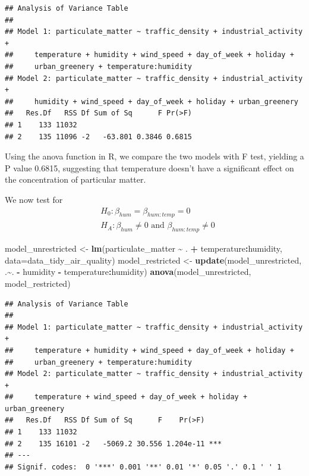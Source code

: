\documentclass[12pt,halfline,a4paper,]{ouparticle}
\newenvironment{Shaded}{\begin{snugshade}}{\end{snugshade}}
\newcommand{\AttributeTok}[1]{\textcolor[rgb]{0.13,0.29,0.53}{#1}}
\newcommand{\FunctionTok}[1]{\textcolor[rgb]{0.13,0.29,0.53}{\textbf{#1}}}
\newcommand{\NormalTok}[1]{#1}
\newcommand{\OtherTok}[1]{\textcolor[rgb]{0.56,0.35,0.01}{#1}}
\newcommand{\SpecialCharTok}[1]{\textcolor[rgb]{0.81,0.36,0.00}{\textbf{#1}}}
\begin{document}
\begin{verbatim}
## Analysis of Variance Table
## 
## Model 1: particulate_matter ~ traffic_density + industrial_activity + 
##     temperature + humidity + wind_speed + day_of_week + holiday + 
##     urban_greenery + temperature:humidity
## Model 2: particulate_matter ~ traffic_density + industrial_activity + 
##     humidity + wind_speed + day_of_week + holiday + urban_greenery
##   Res.Df   RSS Df Sum of Sq      F Pr(>F)
## 1    133 11032                           
## 2    135 11096 -2   -63.801 0.3846 0.6815
\end{verbatim}

Using the anova function in R, we compare the two models with F test,
yielding a P value 0.6815, suggesting that temperature doesn't have a
significant effect on the concentration of particular matter.

We now test for \[
\begin{aligned}
&H_0: \beta_{hum} = \beta_{hum:temp} = 0 \\
&H_A: \beta_{hum} \neq 0 \text{ and } \beta_{hum:temp} \neq 0
\end{aligned}
\]

\begin{Shaded}
\begin{Highlighting}[]
\NormalTok{model\_unrestricted }\OtherTok{\textless{}{-}} \FunctionTok{lm}\NormalTok{(particulate\_matter }\SpecialCharTok{\textasciitilde{}}\NormalTok{ . }\SpecialCharTok{+} 
\NormalTok{                         temperature}\SpecialCharTok{:}\NormalTok{humidity,}
                         \AttributeTok{data=}\NormalTok{data\_tidy\_air\_quality)}
\NormalTok{model\_restricted }\OtherTok{\textless{}{-}} \FunctionTok{update}\NormalTok{(model\_unrestricted, .}\SpecialCharTok{\textasciitilde{}}\NormalTok{.}
                           \SpecialCharTok{{-}}\NormalTok{ humidity}
                           \SpecialCharTok{{-}}\NormalTok{ temperature}\SpecialCharTok{:}\NormalTok{humidity)}
\FunctionTok{anova}\NormalTok{(model\_unrestricted, model\_restricted)}
\end{Highlighting}
\end{Shaded}

\begin{verbatim}
## Analysis of Variance Table
## 
## Model 1: particulate_matter ~ traffic_density + industrial_activity + 
##     temperature + humidity + wind_speed + day_of_week + holiday + 
##     urban_greenery + temperature:humidity
## Model 2: particulate_matter ~ traffic_density + industrial_activity + 
##     temperature + wind_speed + day_of_week + holiday + urban_greenery
##   Res.Df   RSS Df Sum of Sq      F    Pr(>F)    
## 1    133 11032                                  
## 2    135 16101 -2   -5069.2 30.556 1.204e-11 ***
## ---
## Signif. codes:  0 '***' 0.001 '**' 0.01 '*' 0.05 '.' 0.1 ' ' 1
\end{verbatim}
\end{document}
